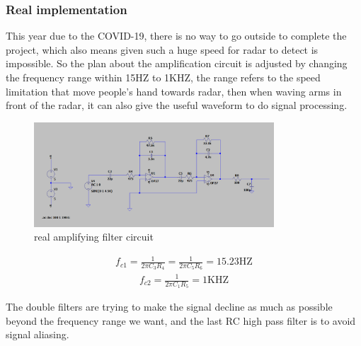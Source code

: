 \subsubsection{Real implementation}
This year due to the COVID-19, there is no way to go outside to complete the project, which also means given such a huge speed for radar to detect is impossible. So the plan about the amplification circuit is adjusted by changing the frequency range within 15HZ to 1KHZ, the range refers to the speed limitation that move people's hand towards radar, then when waving arms in front of the radar, it can also give the useful waveform to do signal processing.
\begin{figure}[H]
    \centering
    \includegraphics[width=0.8\textwidth]{figure/realamplifyingfiltercircuit.png}
    \caption{real amplifying filter circuit}
\end{figure}
\begin{align}
f_{c 1}=\frac{1}{2 \pi C_{3} R_{4}}=\frac{1}{2 \pi C_{5} R_{6}}=15.23 \mathrm{HZ}
\end{align}
\begin{align}
f_{c 2}=\frac{1}{2 \pi C_{1} R_{5}}=1 \mathrm{KHZ}
\end{align}

The double filters are trying to make the signal decline as much as possible beyond the frequency range we want, and the last RC high pass filter is to avoid signal aliasing. 
